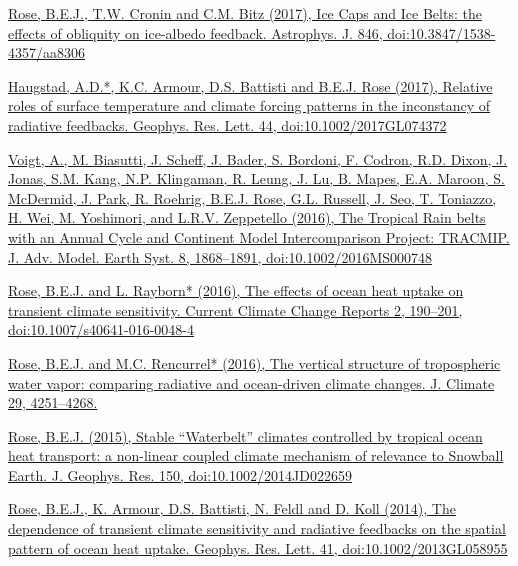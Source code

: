 \documentclass[11pt, letterpaper]{article} %
\newcommand{\years}[1]{\marginnote{\scriptsize #1}} %
\newcommand{\publink}{http://www.atmos.albany.edu/facstaff/brose/resources/Publications/}
\begin{document}
\href{\publink Rose_2017_ApJ_846_28.pdf}{\underline{Rose, B.E.J.}, T.W. Cronin and C.M. Bitz (2017), Ice Caps and Ice Belts: the effects of obliquity on ice-albedo feedback. Astrophys. J. 846, doi:10.3847/1538-4357/aa8306}
\vspace{0.2 cm}

\href{\publink Haugstad_et_al-2017-Geophysical_Research_Letters.pdf}{Haugstad, A.D.*, K.C. Armour, D.S. Battisti and \underline{B.E.J. Rose} (2017), Relative roles of surface temperature and climate forcing patterns in the inconstancy of radiative feedbacks. Geophys. Res. Lett. 44, doi:10.1002/2017GL074372}
\vspace{0.2 cm}

\years{2016}
\href{\publink Voigt_et_al-2016-TRACMIP.pdf}{Voigt, A., M. Biasutti, J. Scheff, J. Bader, S. Bordoni, F. Codron, R.D. Dixon, J. Jonas, S.M. Kang, N.P. Klingaman, R. Leung, J. Lu, B. Mapes, E.A. Maroon, S. McDermid, J. Park, R. Roehrig, \underline{B.E.J. Rose}, G.L. Russell, J. Seo, T. Toniazzo, H. Wei, M. Yoshimori, and L.R.V. Zeppetello (2016), The Tropical Rain belts with an Annual Cycle and Continent Model Intercomparison Project: TRACMIP. J. Adv. Model. Earth Syst. 8, 1868--1891, doi:10.1002/2016MS000748}
\vspace{0.2 cm}
 
\href{\publink Rose_Rayborn_CCCR2016.pdf}{\underline{Rose, B.E.J.} and L. Rayborn* (2016), The effects of ocean heat uptake on transient climate sensitivity. Current Climate Change Reports 2, 190--201, doi:10.1007/s40641-016-0048-4}
\vspace{0.2 cm}
   
\href{\publink Rose_Rencurrel_JClim2016.pdf}{\underline{Rose, B.E.J.} and M.C. Rencurrel* (2016), The vertical structure of tropospheric water vapor: comparing radiative and ocean-driven climate changes. J. Climate 29, 4251--4268.}
\vspace{0.2 cm}
 
\years{2015}  
\href{\publink Rose_JGR2015.pdf}{\underline{Rose, B.E.J.} (2015), Stable ``Waterbelt'' climates controlled by tropical ocean heat transport: a non-linear coupled climate mechanism of relevance to Snowball Earth. J. Geophys. Res. 150, doi:10.1002/2014JD022659}
\vspace{0.2 cm}
 
\years{2014}  
\href{\publink Rose_etal_GRL2014.pdf}{\underline{Rose, B.E.J.}, K. Armour, D.S. Battisti, N. Feldl and D. Koll (2014), The dependence of transient climate sensitivity and radiative feedbacks on the spatial pattern of ocean heat uptake. Geophys. Res. Lett. 41, doi:10.1002/2013GL058955}
  
\end{document}
